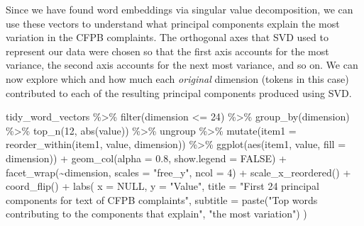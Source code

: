 \documentclass[
]{krantz}
\makeatletter
\newenvironment{Shaded}{\begin{snugshade}}{\end{snugshade}}
\newcommand{\AttributeTok}[1]{\textcolor[rgb]{0.77,0.63,0.00}{#1}}
\newcommand{\ConstantTok}[1]{\textcolor[rgb]{0.00,0.00,0.00}{#1}}
\newcommand{\DecValTok}[1]{\textcolor[rgb]{0.00,0.00,0.81}{#1}}
\newcommand{\FloatTok}[1]{\textcolor[rgb]{0.00,0.00,0.81}{#1}}
\newcommand{\FunctionTok}[1]{\textcolor[rgb]{0.00,0.00,0.00}{#1}}
\newcommand{\NormalTok}[1]{#1}
\newcommand{\SpecialCharTok}[1]{\textcolor[rgb]{0.00,0.00,0.00}{#1}}
\newcommand{\StringTok}[1]{\textcolor[rgb]{0.31,0.60,0.02}{#1}}
\newenvironment{kframe}{%
\medskip{}
\setlength{\fboxsep}{.8em}
 \def\at@end@of@kframe{}%
 \ifinner\ifhmode%
  \def\at@end@of@kframe{\end{minipage}}%
  \begin{minipage}{\columnwidth}%
 \fi\fi%
 \def\FrameCommand##1{\hskip\@totalleftmargin \hskip-\fboxsep
 \colorbox{shadecolor}{##1}\hskip-\fboxsep
     \hskip-\linewidth \hskip-\@totalleftmargin \hskip\columnwidth}%
 \MakeFramed {\advance\hsize-\width
   \@totalleftmargin\z@ \linewidth\hsize
   \@setminipage}}%
 {\par\unskip\endMakeFramed%
 \at@end@of@kframe}
\renewenvironment{Shaded}{\begin{kframe}}{\end{kframe}}
\makeatother
\begin{document}
Since we have found word embeddings via singular value decomposition, we can use these vectors to understand what principal components explain the most variation in the CFPB complaints. The orthogonal axes that SVD used to represent our data were chosen so that the first axis accounts for the most variance, the second axis accounts for the next most variance, and so on. We can now explore which and how much each \emph{original} dimension (tokens in this case) contributed to each of the resulting principal components produced using SVD.

\begin{Shaded}
\begin{Highlighting}[]
\NormalTok{tidy\_word\_vectors }\SpecialCharTok{\%\textgreater{}\%}
    \FunctionTok{filter}\NormalTok{(dimension }\SpecialCharTok{\textless{}=} \DecValTok{24}\NormalTok{) }\SpecialCharTok{\%\textgreater{}\%}
    \FunctionTok{group\_by}\NormalTok{(dimension) }\SpecialCharTok{\%\textgreater{}\%}
    \FunctionTok{top\_n}\NormalTok{(}\DecValTok{12}\NormalTok{, }\FunctionTok{abs}\NormalTok{(value)) }\SpecialCharTok{\%\textgreater{}\%}
\NormalTok{    ungroup }\SpecialCharTok{\%\textgreater{}\%}
    \FunctionTok{mutate}\NormalTok{(}\AttributeTok{item1 =} \FunctionTok{reorder\_within}\NormalTok{(item1, value, dimension)) }\SpecialCharTok{\%\textgreater{}\%}
    \FunctionTok{ggplot}\NormalTok{(}\FunctionTok{aes}\NormalTok{(item1, value, }\AttributeTok{fill =}\NormalTok{ dimension)) }\SpecialCharTok{+}
    \FunctionTok{geom\_col}\NormalTok{(}\AttributeTok{alpha =} \FloatTok{0.8}\NormalTok{, }\AttributeTok{show.legend =} \ConstantTok{FALSE}\NormalTok{) }\SpecialCharTok{+}
    \FunctionTok{facet\_wrap}\NormalTok{(}\SpecialCharTok{\textasciitilde{}}\NormalTok{dimension, }\AttributeTok{scales =} \StringTok{"free\_y"}\NormalTok{, }\AttributeTok{ncol =} \DecValTok{4}\NormalTok{) }\SpecialCharTok{+}
    \FunctionTok{scale\_x\_reordered}\NormalTok{() }\SpecialCharTok{+}
    \FunctionTok{coord\_flip}\NormalTok{() }\SpecialCharTok{+}
    \FunctionTok{labs}\NormalTok{(}
      \AttributeTok{x =} \ConstantTok{NULL}\NormalTok{,}
      \AttributeTok{y =} \StringTok{"Value"}\NormalTok{,}
      \AttributeTok{title =} \StringTok{"First 24 principal components for text of CFPB complaints"}\NormalTok{,}
      \AttributeTok{subtitle =} \FunctionTok{paste}\NormalTok{(}\StringTok{"Top words contributing to the components that explain"}\NormalTok{,}
                       \StringTok{"the most variation"}\NormalTok{)}
\NormalTok{    )}
\end{Highlighting}
\end{Shaded}
\end{document}

